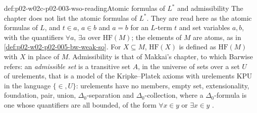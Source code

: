\begin{hbconvention}{def:p02-w02c-p02-003-wso-reading}{Atomic formulas of \(L^{*}\) and admissibility}
The chapter does not list the atomic formulas of \(L^{*}\).  They are read
here as the atomic formulas of \(L\), and \(t\in a\), \(a\in b\) and
\(a=b\) for an \(L\)-term \(t\) and set variables \(a,b\), with the
quantifiers \(\forall a\), \(\exists a\) over \(\mathrm{HF}(M)\); the
elements of \(M\) are atoms, as in \cref{def:p02-w02-p02-005-bw-weak-so}.
For \(X\subseteq M\), \(\mathrm{HF}(X)\) is defined as
\(\mathrm{HF}(M)\) with \(X\) in place of \(M\).  Admissibility is that of
Makkai's chapter, to which Barwise refers: an \emph{admissible set} is a
transitive set \(A\), in the universe of sets over a set \(U\) of
urelements, that is a model of the Kripke--Platek axioms with urelements
\(\mathrm{KPU}\) in the language \(\{\in,U\}\): urelements have no members,
empty set, extensionality, foundation, pair, union,
\(\Delta_0\)-separation and \(\Delta_0\)-collection, where a
\(\Delta_0\)-formula is one whose quantifiers are all bounded, of the form
\(\forall x\in y\) or \(\exists x\in y\)
\cite[ch.~A.7, \S2, 2.1, 2.3, 2.4, pp.~238--239]{Makkai1977}.
\end{hbconvention}


